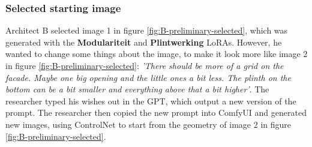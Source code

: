 \subsubsection{Selected starting image}
Architect B selected image 1 in figure \ref{fig:B-preliminary-selected}, which was generated with the \textbf{Modulariteit} and \textbf{Plintwerking} LoRAs. However, he wanted to change some things about the image, to make it look more like image 2 in figure \ref{fig:B-preliminary-selected}: \textit{'There should be more of a grid on the facade. Maybe one big opening and the little ones a bit less. The plinth on the bottom can be a bit smaller and everything above that a bit higher'}. The researcher typed his wishes out in the GPT, which output a new version of the prompt. The researcher then copied the new prompt into ComfyUI and generated new images, using ControlNet to start from the geometry of image 2 in figure \ref{fig:B-preliminary-selected}.
